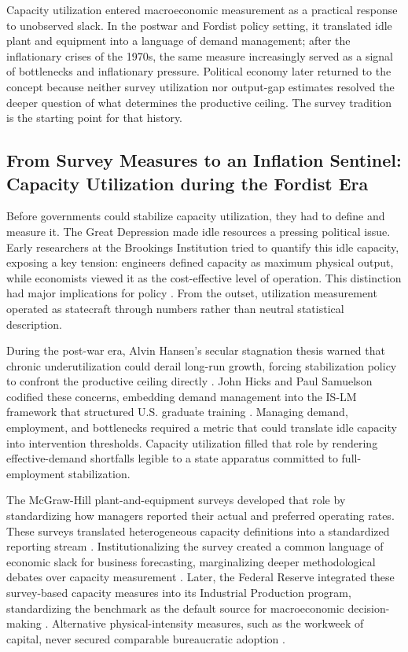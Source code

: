 \documentclass[11pt]{article}
\begin{document}
Capacity utilization entered macroeconomic measurement as a practical response to unobserved slack. In the postwar and Fordist policy setting, it translated idle plant and equipment into a language of demand management; after the inflationary crises of the 1970s, the same measure increasingly served as a signal of bottlenecks and inflationary pressure. Political economy later returned to the concept because neither survey utilization nor output-gap estimates resolved the deeper question of what determines the productive ceiling. The survey tradition is the starting point for that history.

\subsection{From Survey Measures to an Inflation Sentinel: Capacity Utilization during the Fordist Era}
\label{subsec:fordist_survey_statecraft}

Before governments could stabilize capacity utilization, they had to define and measure it. The Great Depression made idle resources a pressing political issue. Early researchers at the Brookings Institution tried to quantify this idle capacity, exposing a key tension: engineers defined capacity as maximum physical output, while economists viewed it as the cost-effective level of operation. This distinction had major implications for policy \citep{Burns1954, KleinDavid1958}. From the outset, utilization measurement operated as statecraft through numbers rather than neutral statistical description.

During the post-war era, Alvin Hansen's secular stagnation thesis warned that chronic underutilization could derail long-run growth, forcing stabilization policy to confront the productive ceiling directly \citep{Hansen1936, Hansen1941, Barber1987}. John Hicks and Paul Samuelson codified these concerns, embedding demand management into the IS-LM framework that structured U.S. graduate training \citep{Hicks1937, Samuelson1947, Samuelson1948}. Managing demand, employment, and bottlenecks required a metric that could translate idle capacity into intervention thresholds. Capacity utilization filled that role by rendering effective-demand shortfalls legible to a state apparatus committed to full-employment stabilization.

The McGraw-Hill plant-and-equipment surveys developed that role by standardizing how managers reported their actual and preferred operating rates. These surveys translated heterogeneous capacity definitions into a standardized reporting stream \citep{Butler1958, Phillips1963}. Institutionalizing the survey created a common language of economic slack for business forecasting, marginalizing deeper methodological debates over capacity measurement \citep{BaranSweezy1988, Munroe2007}. Later, the Federal Reserve integrated these survey-based capacity measures into its Industrial Production program, standardizing the benchmark as the default source for macroeconomic decision-making \citep{Board2017}. Alternative physical-intensity measures, such as the workweek of capital, never secured comparable bureaucratic adoption \citep{Foss1963, TaubmanGottschalk1971}.
\end{document}
